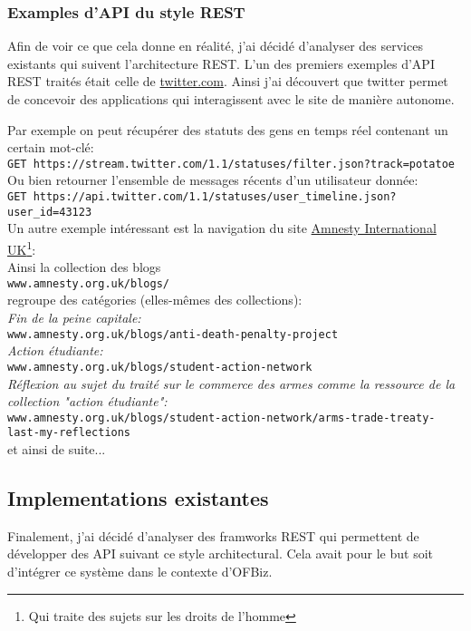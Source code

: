 \subsubsection{Examples d'API du style REST}
Afin de voir ce que cela donne en réalité, j'ai décidé d'analyser des services existants qui suivent l'architecture REST. 
L'un des premiers exemples d'API REST traités était celle de \href{https://twitter.com/}{twitter.com}. Ainsi j'ai découvert que twitter permet de concevoir des applications qui interagissent avec le site de manière autonome. 

Par exemple on peut récupérer des statuts des gens en temps réel contenant un certain mot-clé: \\
\verb|GET https://stream.twitter.com/1.1/statuses/filter.json?track=potatoe|\\

Ou bien retourner l'ensemble de messages récents d'un utilisateur donnée:\\
\verb|GET https://api.twitter.com/1.1/statuses/user_timeline.json?user_id=43123|
\\

Un autre exemple intéressant est la navigation du site  \href{https://www.amnesty.org.uk/}{Amnesty International UK}\footnote{ Qui traite des sujets sur les droits de l'homme}:
\\
Ainsi la collection des blogs \\
\verb|www.amnesty.org.uk/blogs/|\\
regroupe des catégories (elles-mêmes des collections): \\
 \emph{Fin de la peine capitale:} \\
 \verb|www.amnesty.org.uk/blogs/anti-death-penalty-project|\\
 \emph{Action étudiante:}\\
 \verb|www.amnesty.org.uk/blogs/student-action-network|\\
 \emph{Réflexion au sujet du traité sur le commerce des armes comme la ressource de la collection "action étudiante":} \\
 \verb|www.amnesty.org.uk/blogs/student-action-network/arms-trade-treaty-last-my-reflections| \\
 et ainsi de suite...
 

\subsection{Implementations existantes}
Finalement, j'ai décidé d'analyser des framworks REST qui permettent de développer des API suivant ce style architectural. Cela avait pour le but soit d'intégrer ce système dans le contexte d'OFBiz.
